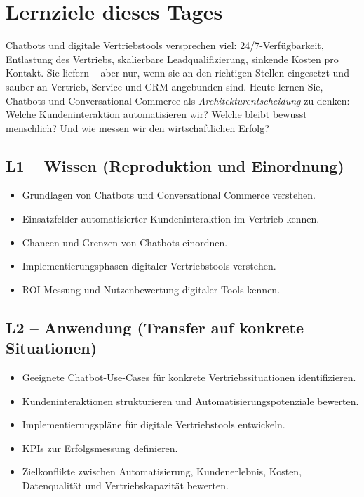 \documentclass[11pt,a4paper,oneside]{article}
\begin{document}
\section*{Lernziele dieses Tages}
\thispagestyle{plain}

\noindent Chatbots und digitale Vertriebstools versprechen viel: 24/7-Verfügbarkeit, Entlastung des Vertriebs, skalierbare Leadqualifizierung, sinkende Kosten pro Kontakt. Sie liefern -- aber nur, wenn sie an den richtigen Stellen eingesetzt und sauber an Vertrieb, Service und CRM angebunden sind. Heute lernen Sie, Chatbots und Conversational Commerce als \emph{Architekturentscheidung} zu denken: Welche Kundeninteraktion automatisieren wir? Welche bleibt bewusst menschlich? Und wie messen wir den wirtschaftlichen Erfolg?

\subsection*{L1 -- Wissen (Reproduktion und Einordnung)}
\begin{itemize}
  \item Grundlagen von Chatbots und Conversational Commerce verstehen.
  \item Einsatzfelder automatisierter Kundeninteraktion im Vertrieb kennen.
  \item Chancen und Grenzen von Chatbots einordnen.
  \item Implementierungsphasen digitaler Vertriebstools verstehen.
  \item ROI-Messung und Nutzenbewertung digitaler Tools kennen.
\end{itemize}

\subsection*{L2 -- Anwendung (Transfer auf konkrete Situationen)}
\begin{itemize}
  \item Geeignete Chatbot-Use-Cases für konkrete Vertriebssituationen identifizieren.
  \item Kundeninteraktionen strukturieren und Automatisierungspotenziale bewerten.
  \item Implementierungspläne für digitale Vertriebstools entwickeln.
  \item KPIs zur Erfolgsmessung definieren.
  \item Zielkonflikte zwischen Automatisierung, Kundenerlebnis, Kosten, Datenqualität und Vertriebskapazität bewerten.
\end{itemize}
\end{document}
